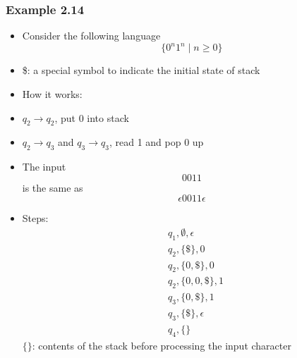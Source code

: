 \begin{frame}[allowframebreaks] \frametitle{Example 2.14}
  \begin{itemize}
  \item Consider the following language
    \begin{equation*}
    \{0^n 1^n\mid n \geq 0\}
  \end{equation*}

\begin{center}
\end{center}
\item \$: a special symbol to indicate the initial state of stack

  
\item How it works:
  \item [] $q_2 \rightarrow q_2$, put 0 into stack

  \item [] $q_2 \rightarrow q_3$ and $q_3 \rightarrow q_3$, read 1 and  pop 0 up
  \item The input
  \begin{equation*}
    0011
  \end{equation*}
is the same as
  \begin{equation*}
    \epsilon 0011 \epsilon
  \end{equation*}
\item Steps:
  \begin{equation*}
    \begin{split}
& q_1, \emptyset, \epsilon\\
& q_2, \{\$\}, 0 \\
& q_2, \{0,\$\}, 0\\
& q_2, \{0,0,\$\}, 1\\
& q_3, \{0,\$\}, 1\\
& q_3, \{\$\}, \epsilon\\
& q_4, \{\}
\end{split}
\end{equation*}
$\{\}$: contents of the stack before processing the input
character


\end{itemize}
\end{frame}
